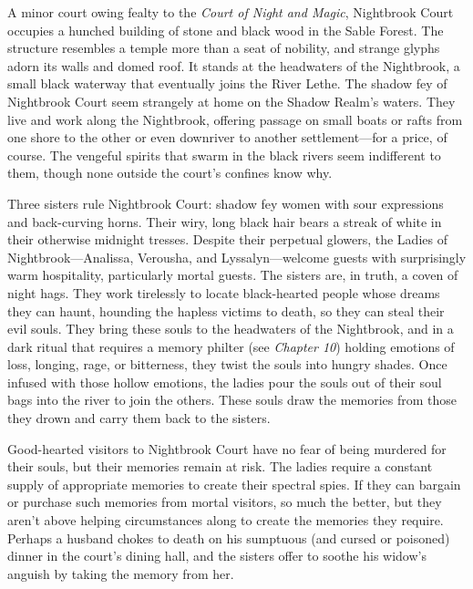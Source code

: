 \documentclass[10pt,a4paper,twoside,bg=print,twocolumn,openany,nodeprecatedcode]{dndbook}
\begin{document}
A minor court owing fealty to the \textit{Court of Night and Magic}, Nightbrook Court occupies a hunched building of stone and black wood in the Sable Forest. The structure resembles a temple more than a seat of nobility, and strange glyphs adorn its walls and domed roof. It stands at the headwaters of the Nightbrook, a small black waterway that eventually joins the River Lethe. The shadow fey of Nightbrook Court seem strangely at home on the Shadow Realm's waters. They live and work along the Nightbrook, offering passage on small boats or rafts from one shore to the other or even downriver to another settlement—for a price, of course. The vengeful spirits that swarm in the black rivers seem indifferent to them, though none outside the court's confines know why.

Three sisters rule Nightbrook Court: shadow fey women with sour expressions and back-curving horns. Their wiry, long black hair bears a streak of white in their otherwise midnight tresses. Despite their perpetual glowers, the Ladies of Nightbrook—Analissa, Verousha, and Lyssalyn—welcome guests with surprisingly warm hospitality, particularly mortal guests. The sisters are, in truth, a coven of night hags. They work tirelessly to locate black-hearted people whose dreams they can haunt, hounding the hapless victims to death, so they can steal their evil souls. They bring these souls to the headwaters of the Nightbrook, and in a dark ritual that requires a memory philter (see \textit{Chapter 10}) holding emotions of loss, longing, rage, or bitterness, they twist the souls into hungry shades. Once infused with those hollow emotions, the ladies pour the souls out of their soul bags into the river to join the others. These souls draw the memories from those they drown and carry them back to the sisters.

Good-hearted visitors to Nightbrook Court have no fear of being murdered for their souls, but their memories remain at risk. The ladies require a constant supply of appropriate memories to create their spectral spies. If they can bargain or purchase such memories from mortal visitors, so much the better, but they aren't above helping circumstances along to create the memories they require. Perhaps a husband chokes to death on his sumptuous (and cursed or poisoned) dinner in the court's dining hall, and the sisters offer to soothe his widow's anguish by taking the memory from her.
\end{document}
